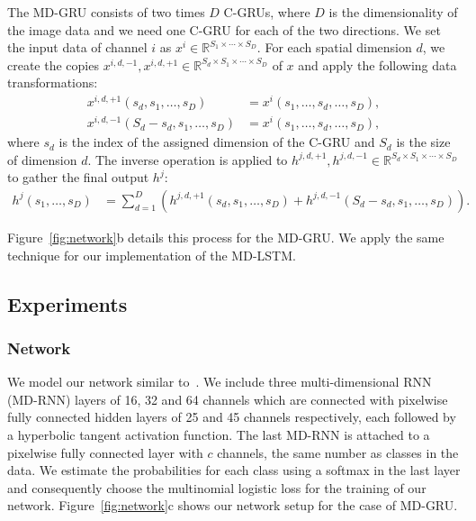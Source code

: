\documentclass[runningheads,a4paper]{llncs}
\begin{document}
The MD-GRU consists of two times $D$ C-GRUs, where $D$ is the dimensionality of the image data and we need one C-GRU for each of the two directions. We set the input data of channel $i$ as $x^i \in \mathbb{R}^{S_1\times \cdots\times S_D}$. For each spatial dimension $d$, we create the copies $x^{i,d,-1}, x^{i,d,+1} \in \mathbb{R}^{S_d\times S_1\times \cdots\times S_D}$ of $x$ and apply the following data transformations:
\begin{align}
 x^{i,d,+1}(s_d, s_1, \dots, s_{D}) &= x^i(s_1, \dots, s_d,\dots, s_{D}),\\
 x^{i,d,-1}(S_d-s_d, s_1, \dots, s_{D}) &= x^i(s_1,\dots , s_d,\dots, s_{D}),
\end{align}
where $s_d$ is the index of the assigned dimension of the C-GRU and $S_d$ is the size of dimension $d$. The inverse operation is applied to $h^{j,d,+1},h^{j,d,-1} \in \mathbb{R}^{S_d\times S_1\times \cdots\times S_D}$ to gather the final output $h^j$:
\begin{align}
h^j(s_1,\dots, s_{D}) &= \sum\limits_{d=1}^D \left ( h^{j,d,+1}(s_d, s_1, \dots, s_{D}) + h^{j,d,-1}(S_d-s_d, s_1, \dots, s_{D}) \right ).
\end{align}

Figure~\ref{fig:network}b details this process for the MD-GRU. We apply the same technique for our implementation of the MD-LSTM.
\subsection{Experiments}
\subsubsection{Network}
We model our network similar to~\cite{stollenga_parallel_2015}. We include three multi-dimensional RNN (MD-RNN) layers of 16, 32 and 64 channels which are connected with pixelwise fully connected hidden layers of 25 and 45 channels respectively, each followed by a hyperbolic tangent activation function. The last MD-RNN is attached to a pixelwise fully connected layer with $c$ channels, the same number as classes in the data. We estimate the probabilities for each class using a softmax in the last layer and consequently choose the multinomial logistic loss for the training of our network. Figure~\ref{fig:network}c shows our network setup for the case of MD-GRU.
\end{document}

